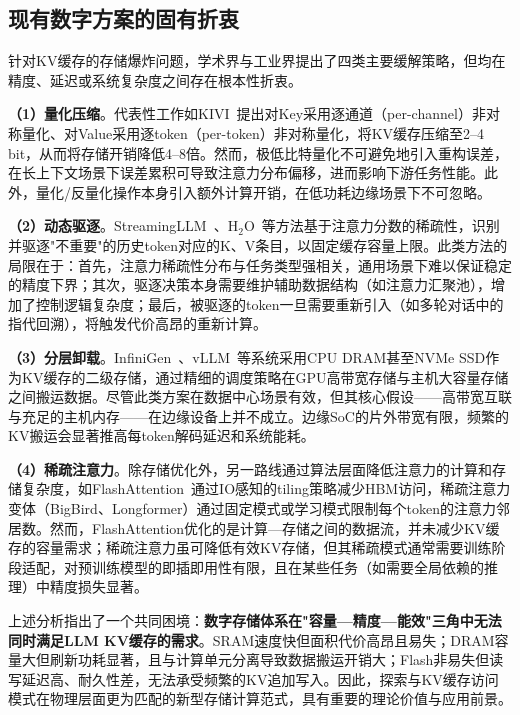 \subsection{现有数字方案的固有折衷}

针对KV缓存的存储爆炸问题，学术界与工业界提出了四类主要缓解策略，但均在精度、延迟或系统复杂度之间存在根本性折衷。

\textbf{（1）量化压缩}。代表性工作如KIVI~\cite{liu2024kivi}提出对Key采用逐通道（per-channel）非对称量化、对Value采用逐token（per-token）非对称量化，将KV缓存压缩至2–4 bit，从而将存储开销降低4–8倍。然而，极低比特量化不可避免地引入重构误差，在长上下文场景下误差累积可导致注意力分布偏移，进而影响下游任务性能。此外，量化/反量化操作本身引入额外计算开销，在低功耗边缘场景下不可忽略。

\textbf{（2）动态驱逐}。StreamingLLM~\cite{xiao2024streamingllm}、H$_2$O~\cite{zhang2023h2o}等方法基于注意力分数的稀疏性，识别并驱逐"不重要"的历史token对应的K、V条目，以固定缓存容量上限。此类方法的局限在于：首先，注意力稀疏性分布与任务类型强相关，通用场景下难以保证稳定的精度下界；其次，驱逐决策本身需要维护辅助数据结构（如注意力汇聚池），增加了控制逻辑复杂度；最后，被驱逐的token一旦需要重新引入（如多轮对话中的指代回溯），将触发代价高昂的重新计算。

\textbf{（3）分层卸载}。InfiniGen~\cite{lee2024infinigen}、vLLM~\cite{kwon2023efficient}等系统采用CPU DRAM甚至NVMe SSD作为KV缓存的二级存储，通过精细的调度策略在GPU高带宽存储与主机大容量存储之间搬运数据。尽管此类方案在数据中心场景有效，但其核心假设——高带宽互联与充足的主机内存——在边缘设备上并不成立。边缘SoC的片外带宽有限，频繁的KV搬运会显著推高每token解码延迟和系统能耗。

\textbf{（4）稀疏注意力}。除存储优化外，另一路线通过算法层面降低注意力的计算和存储复杂度，如FlashAttention~\cite{dao2022flashattention}通过IO感知的tiling策略减少HBM访问，稀疏注意力变体（BigBird、Longformer）通过固定模式或学习模式限制每个token的注意力邻居数。然而，FlashAttention优化的是计算—存储之间的数据流，并未减少KV缓存的容量需求；稀疏注意力虽可降低有效KV存储，但其稀疏模式通常需要训练阶段适配，对预训练模型的即插即用性有限，且在某些任务（如需要全局依赖的推理）中精度损失显著。

上述分析指出了一个共同困境：\textbf{数字存储体系在"容量—精度—能效"三角中无法同时满足LLM KV缓存的需求}。SRAM速度快但面积代价高昂且易失；DRAM容量大但刷新功耗显著，且与计算单元分离导致数据搬运开销大；Flash非易失但读写延迟高、耐久性差，无法承受频繁的KV追加写入。因此，探索与KV缓存访问模式在物理层面更为匹配的新型存储计算范式，具有重要的理论价值与应用前景。

